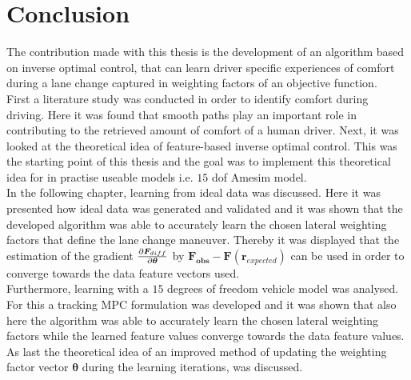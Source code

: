 \chapter{Conclusion}
\label{cha:conclusion}
The contribution made with this thesis is the development of an algorithm based on inverse optimal control, that can learn driver specific experiences of comfort during a lane change captured in weighting factors of an objective function.\\
First a literature study was conducted in order to identify comfort during driving. Here it was found that smooth paths play an important role in contributing to the retrieved amount of comfort of a human driver. Next, it was looked at the theoretical idea of feature-based inverse optimal control. This was the starting point of this thesis and the goal was to implement this theoretical idea for in practise useable models i.e. $15$ dof Amesim model.\\
In the following chapter, learning from ideal data was discussed. Here it was presented how ideal data was generated and validated and it was shown that the developed algorithm was able to accurately learn the chosen lateral weighting factors that define the lane change maneuver. Thereby it was displayed that the estimation of the gradient $\pdv{\bm{F}_{diff}}{\bm{\theta}}$ by $ \bm{F_{obs}} - \bm{F}(\bm{r}_{expected})$ can be used in order to converge towards the data feature vectors used.\\
Furthermore, learning with a $15$ degrees of freedom vehicle model was analysed. For this a tracking MPC formulation was developed and it was shown that also here 
the algorithm was able to accurately learn the chosen lateral weighting factors while the learned feature values converge towards the data feature values.\\
As last the theoretical idea of an improved method of updating the weighting factor vector $\bm{\theta}$ during the learning iterations, was discussed.\\


